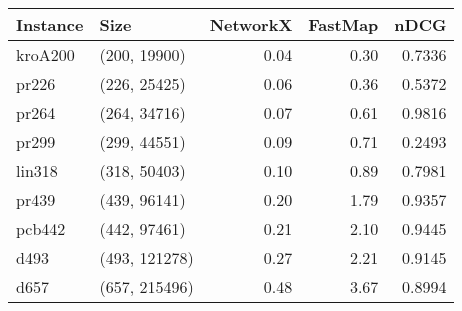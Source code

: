 \begin{tabular}{llrrr}
\toprule
Instance &          Size &  NetworkX &  FastMap &   nDCG \\
\midrule
 kroA200 &  (200, 19900) &      0.04 &     0.30 & 0.7336 \\
   pr226 &  (226, 25425) &      0.06 &     0.36 & 0.5372 \\
   pr264 &  (264, 34716) &      0.07 &     0.61 & 0.9816 \\
   pr299 &  (299, 44551) &      0.09 &     0.71 & 0.2493 \\
  lin318 &  (318, 50403) &      0.10 &     0.89 & 0.7981 \\
   pr439 &  (439, 96141) &      0.20 &     1.79 & 0.9357 \\
  pcb442 &  (442, 97461) &      0.21 &     2.10 & 0.9445 \\
    d493 & (493, 121278) &      0.27 &     2.21 & 0.9145 \\
    d657 & (657, 215496) &      0.48 &     3.67 & 0.8994 \\
\bottomrule
\end{tabular}
